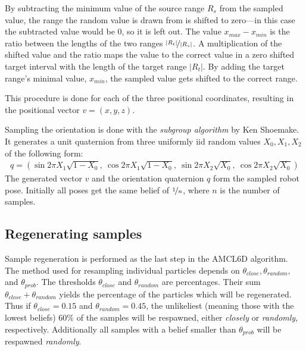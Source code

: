 \documentclass[Thesis.tex]{subfiles}
\begin{document}
By subtracting the minimum value of the source range $R_s$ from the sampled value, the range the random value is drawn from is shifted to zero---in this case the subtracted value would be $0$, so it is left out. The value $x_{max} - x_{min}$ is the ratio between the lengths of the two ranges $\nicefrac{|R_t|}{|R_s|}$. A multiplication of the shifted value and the ratio maps the value to the correct value in a zero shifted target interval with the length of the target range $|R_t|$. By adding the target range's minimal value, $x_{min}$, the sampled value gets shifted to the correct range.

This procedure is done for each of the three positional coordinates, resulting in the positional vector $v = \left(x, y, z\right)$.

Sampling the orientation is done with the \emph{subgroup algorithm} by Ken Shoemake\cite{gfxgems:1995}. It generates a unit quaternion from three uniformly \gls{iid} random values $X_0, X_1, X_2$ of the following form:
%
\begin{align}
q = \left( \sin{2\pi X_1}\sqrt{1-X_0},\: \cos{2\pi X_1}\sqrt{1-X_0},\: 
           \sin{2\pi X_2}\sqrt{  X_0},\: \cos{2\pi X_2}\sqrt{  X_0} \right)
\end{align}
%
%
The generated vector $v$ and the orientation quaternion $q$ form the sampled robot pose. Initially all poses get the same belief of $\nicefrac{1}{n}$, where $n$ is the number of samples.

\subsection{Regenerating samples}
Sample regeneration is performed as the last step in the \gls{AMCL6D} algorithm. The method used for resampling individual particles depends on $\theta_{close}, \theta_{random},$ and $\theta_{prob}$. The thresholds $\theta_{close}$ and $\theta_{random}$ are percentages. Their sum $\theta_{close}+\theta_{random}$ yields the percentage of the particles which will be regenerated. Thus if $\theta_{close} = 0.15$ and $\theta_{random} = 0.45$, the unlikeliest (meaning those with the lowest beliefs) $60 \%$ of the samples will be respawned, either \emph{closely} or \emph{randomly}, respectively. Additionally all samples with a belief smaller than $\theta_{prob}$ will be respawned \emph{randomly}.
\end{document}
